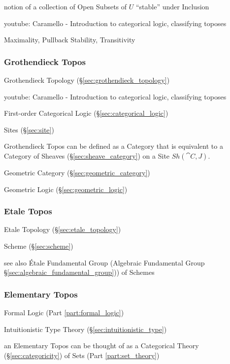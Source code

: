 notion of a collection of Open Subsets of $U$ ``stable'' under
Inclusion %

youtube: Caramello - Introduction to categorical logic, classifying
toposes

Maximality, Pullback Stability, Transitivity %



\subsubsection{Grothendieck Topos}\label{sec:grothendieck_topos}

Grothendieck Topology (\S\ref{sec:grothendieck_topology})

youtube: Caramello - Introduction to categorical logic, classifying
toposes

First-order Categorical Logic (\S\ref{sec:categorical_logic})

Sites (\S\ref{sec:site})

Grothendieck Topos can be defined as a Category that is equivalent to
a Category of Sheaves (\S\ref{sec:sheave_category}) on a Site
$Sh(\cat{C},J)$.

Geometric Category (\S\ref{sec:geometric_category})

Geometric Logic (\S\ref{sec:geometric_logic})



\subsubsection{Etale Topos}\label{sec:etale_topos}

Etale Topology (\S\ref{sec:etale_topology})

Scheme (\S\ref{sec:scheme})

see also \'Etale Fundamental Group (Algebraic Fundamental Group
\S\ref{sec:algebraic_fundamental_group})) of Schemes



\subsubsection{Elementary Topos}\label{sec:elementary_topos}

Formal Logic (Part \ref{part:formal_logic})

Intuitionistic Type Theory (\S\ref{sec:intuitionistic_type})

an Elementary Topos can be thought of as a Categorical Theory
(\S\ref{sec:categoricity}) of Sets (Part \ref{part:set_theory})



